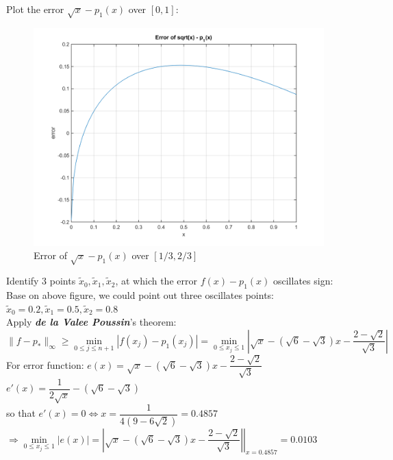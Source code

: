 \documentclass[14pt,a4paper]{article}
\begin{document}
\begin{enumerate}
	Plot the error $\sqrt{x} - p_1(x)$ over $[0,1]$:
	\begin{figure}[htp]
		\centering
		\includegraphics[scale =0.6]{hw3_11a.png}
		\caption{Error of $\sqrt{x} - p_1(x)$ over $[1/3, 2/3]$}
	\end{figure}
		
	Identify 3 points $\tilde{x}_0, \tilde{x}_1, \tilde{x}_2$, at which the error $f(x) - p_1(x)$ oscillates sign:\\
	Base on above figure, we could point out three oscillates points:\\ 
	\hspace*{2cm} $\tilde{x}_0 = 0.2, \tilde{x}_1 = 0.5, \tilde{x}_2 = 0.8$ \\
		Apply \textbf{\textit{de la Valee Poussin}}'s theorem:\\
	$\|f-p_*\|_{\infty} \geq \min\limits_{0\leq j \leq n+1} |f(x_j) - p_1(x_j)| = \min\limits_{0\leq x_j \leq 1} \left|\sqrt{x} - (\sqrt{6} - \sqrt{3})x - \dfrac{2 -\sqrt{2}}{\sqrt{3}} \right|$\\
	For error function: $e(x) = \sqrt{x} - (\sqrt{6} - \sqrt{3})x - \dfrac{2 -\sqrt{2}}{\sqrt{3}}$\\
	\hspace*{3.4cm} $ e'(x) = \dfrac{1}{2\sqrt{x}} - (\sqrt{6}-\sqrt{3})$ \\
	so that $ e'(x) = 0 \Leftrightarrow x = \dfrac{1}{4(9-6\sqrt{2})} = 0.4857$\\
	$\Rightarrow \min\limits_{0\leq x_j \leq 1}|e(x)| = \left. \left|\sqrt{x} - (\sqrt{6} - \sqrt{3})x - \dfrac{2 -\sqrt{2}}{\sqrt{3}} \right| \right|_{x = 0.4857} = 0.0103 $ \\
	

\end{enumerate}
\end{document}

